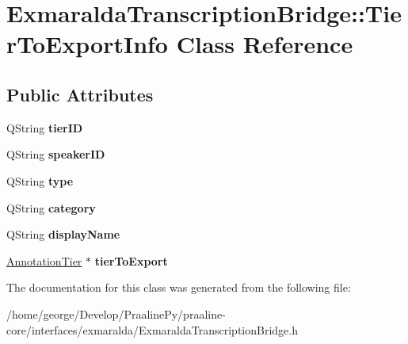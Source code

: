 \hypertarget{class_exmaralda_transcription_bridge_1_1_tier_to_export_info}{}\section{Exmaralda\+Transcription\+Bridge\+:\+:Tier\+To\+Export\+Info Class Reference}
\label{class_exmaralda_transcription_bridge_1_1_tier_to_export_info}
\subsection*{Public Attributes}
\begin{DoxyCompactItemize}
\item 
\mbox{\label{class_exmaralda_transcription_bridge_1_1_tier_to_export_info_a8b01f9354a1f0fe523bf68de5039782b}} 
Q\+String {\bfseries tier\+ID}
\item 
\mbox{\label{class_exmaralda_transcription_bridge_1_1_tier_to_export_info_a10404a695d259b91afb2266c57d568d8}} 
Q\+String {\bfseries speaker\+ID}
\item 
\mbox{\label{class_exmaralda_transcription_bridge_1_1_tier_to_export_info_a2cf46126fa05a9b6700ed4e1430da344}} 
Q\+String {\bfseries type}
\item 
\mbox{\label{class_exmaralda_transcription_bridge_1_1_tier_to_export_info_aef0888cd219c8db24d9107d048c15b65}} 
Q\+String {\bfseries category}
\item 
\mbox{\label{class_exmaralda_transcription_bridge_1_1_tier_to_export_info_aeff846a4b455a151340e0022c5f3f467}} 
Q\+String {\bfseries display\+Name}
\item 
\mbox{\label{class_exmaralda_transcription_bridge_1_1_tier_to_export_info_a7623e0ec06b01a1781d23df863f62117}} 
\hyperlink{class_annotation_tier}{Annotation\+Tier} $\ast$ {\bfseries tier\+To\+Export}
\end{DoxyCompactItemize}


The documentation for this class was generated from the following file\+:\begin{DoxyCompactItemize}
\item 
/home/george/\+Develop/\+Praaline\+Py/praaline-\/core/interfaces/exmaralda/Exmaralda\+Transcription\+Bridge.\+h\end{DoxyCompactItemize}
